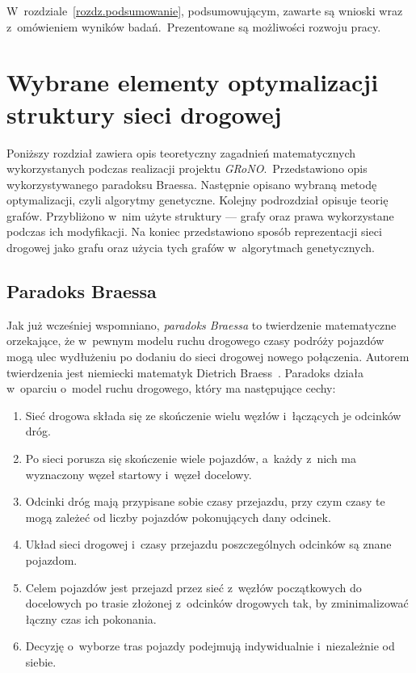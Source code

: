 \documentclass[twoside,12pt]{report}
\let\oldsection\chapter
\def\chapter{\cleardoublepage\oldsection}
\begin{document}
W~rozdziale~\ref{rozdz.podsumowanie}, podsumowującym, zawarte są wnioski wraz z~omówieniem wyników badań.~Prezentowane są możliwości rozwoju pracy. 

\chapter{Wybrane elementy optymalizacji struktury sieci drogowej}\label{rozdz.teoria} 
Poniższy rozdział zawiera opis teoretyczny zagadnień matematycznych wykorzystanych podczas realizacji projektu \textit{GRoNO}.~Przedstawiono opis wykorzystywanego paradoksu Braessa. Następnie opisano wybraną metodę optymalizacji, czyli algorytmy genetyczne. Kolejny podrozdział opisuje teorię grafów. Przybliżono w~nim użyte struktury --- grafy oraz prawa wykorzystane podczas ich modyfikacji. Na koniec przedstawiono sposób reprezentacji sieci drogowej jako grafu oraz użycia tych grafów w~algorytmach genetycznych.

\section{Paradoks Braessa}
Jak już wcześniej wspomniano, \textit{paradoks Braessa} to twierdzenie matematyczne orzekające, że w~pewnym modelu ruchu drogowego czasy podróży pojazdów mogą ulec wydłużeniu po dodaniu do sieci drogowej nowego połączenia. Autorem twierdzenia jest niemiecki matematyk Dietrich Braess~\cite{braess}. Paradoks działa w~oparciu o~model ruchu drogowego, który ma następujące cechy:

\begin{enumerate}
\item Sieć drogowa składa się ze skończenie wielu węzłów i~łączących je odcinków dróg.
\item Po sieci porusza się skończenie wiele pojazdów, a~każdy z~nich ma wyznaczony węzeł startowy i~węzeł docelowy.
\item Odcinki dróg mają przypisane sobie czasy przejazdu, przy czym czasy te mogą zależeć od liczby pojazdów pokonujących dany odcinek.
\item Układ sieci drogowej i~czasy przejazdu poszczególnych odcinków są znane pojazdom.
\item Celem pojazdów jest przejazd przez sieć z~węzłów początkowych do docelowych po trasie złożonej z~odcinków drogowych tak, by zminimalizować łączny czas ich pokonania.
\item Decyzję o~wyborze tras pojazdy podejmują indywidualnie i~niezależnie od siebie.
\end{enumerate}
\end{document}
